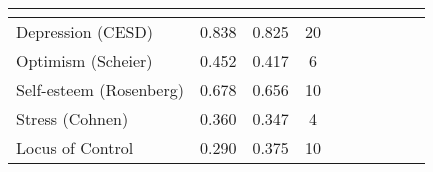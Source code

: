 {
\def\sym#1{\ifmmode^{#1}\else\(^{#1}\)\fi}
\begin{tabular}{l*{3}{SSc}}
\toprule
          &&&\\
\midrule
Depression (CESD)&    0.838&    0.825&       20\\
Optimism (Scheier)&    0.452&    0.417&        6\\
Self-esteem (Rosenberg)&    0.678&    0.656&       10\\
Stress (Cohnen)&    0.360&    0.347&        4\\
Locus of Control&    0.290&    0.375&       10\\
\bottomrule
\end{tabular}
}
